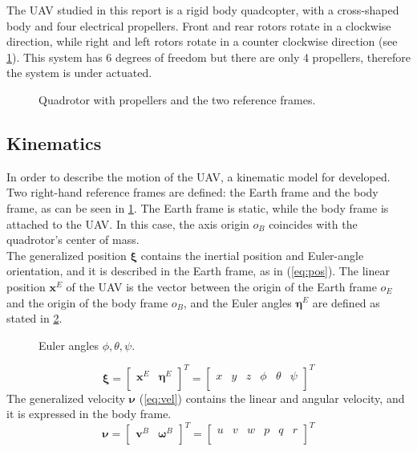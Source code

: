 \documentclass[journal, twoside]{IEEEtran}
\begin{document}
	 The UAV studied in this report is a rigid body quadcopter, with a cross-shaped body and four electrical propellers. Front and rear rotors rotate in a clockwise direction, while right and left rotors rotate in a counter clockwise direction (see \figurename  \ref{fig:frames_rotors}). This system has 6 degrees of freedom but there are only 4 propellers, therefore the system is under actuated. 
	
	\begin{figure}[H]
		\centering
		
		\caption{Quadrotor with propellers and the two reference frames.}
		\label{fig:frames_rotors}
	\end{figure}
	
	\subsection{Kinematics}
	In order to describe the motion of the UAV, a kinematic model for  developed. Two right-hand reference frames are defined: the Earth frame and the body frame, as can be seen in \figurename{ {}\ref{fig:frames_rotors}}. The Earth frame is static, while the body frame is attached to the UAV. In this case, the axis origin $o_B$ coincides with the quadrotor's center of mass.\\

	The generalized position $\bm{\xi}$ contains the inertial position and Euler-angle orientation, and it is described in the Earth frame, as in (\ref{eq:pos}). The linear position $\bm{x}^E$ of the UAV is the vector between the origin of the Earth frame $o_E$ and the origin of the body frame $o_B$, and the Euler angles $\bm{\eta}^E$ are defined as stated in \figurename{ \ref{fig:roll_pitch_yaw}}.
	
	\begin{figure}[h]
		\centering
		
		
		
		\caption{Euler angles $\phi, \theta, \psi$.}
		\label{fig:roll_pitch_yaw}
	\end{figure}

	\begin{equation} \label{eq:pos}
	\bm{\xi} = \left[ \begin{array}{cc}
	\bm{x}^E & \bm{\eta}^E \\
	\end{array}\right]^T = \left[ \begin{array}{cccccc}
	x & y & z & \phi & \theta & \psi\\
	\end{array}\right] ^T
	\end{equation}  
	The generalized velocity $\bm{\nu}$ (\ref{eq:vel}) contains the linear and angular velocity, and it is expressed in the body frame.
	\begin{equation} \label{eq:vel}
	\bm{\nu} = \left[ \begin{array}{cc}
	\bm{v}^B & \bm{\omega}^B \\
	\end{array}\right]^T = \left[ \begin{array}{cccccc}
	u & v & w & p & q & r\\
	\end{array}\right] ^T 
	\end{equation}
	
\end{document}
